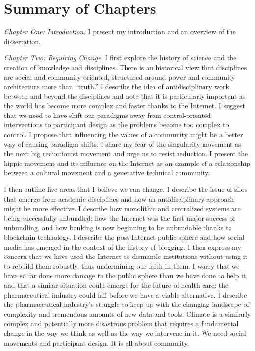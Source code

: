 \section{Summary of Chapters}

\emph{Chapter One: Introduction.} I present my introduction and an overview of the dissertation.

\emph{Chapter Two: Requiring Change.} I first explore the history of science and the creation of knowledge and disciplines. There is an historical view that disciplines are social and community-oriented, structured around power and community architecture more than ``truth.'' I describe the idea of antidisciplinary work between and beyond the disciplines and note that it is particularly important as the world has become more complex and faster thanks to the Internet. I suggest that we need to have shift our paradigms away from control-oriented interventions to participant design as the problems become too complex to control. I propose that influencing the values of a community might be a better way of causing paradigm shifts. I share my fear of the singularity movement as the next big reductionist movement and urge us to resist reduction. I present the hippie movement and its influence on the Internet as an example of a relationship between a cultural movement and a generative technical community.

I then outline five areas that I believe we can change. I describe the issue of silos that emerge from academic disciplines and how an antidisciplinary approach might be more effective. I describe how monolithic and centralized systems are being successfully unbundled; how the Internet was the first major success of unbundling, and how banking is now beginning to be unbundable thanks to blockchain technology. I describe the post-Internet public sphere and how social media has emerged in the context of the history of blogging. I then express my concern that we have used the Internet to dismantle institutions without using it to rebuild them robustly, thus undermining our faith in them. I worry that we have so far done more damage to the public sphere than we have done to help it, and that a similar situation could emerge for the future of health care: the pharmaceutical industry could fail before we have a viable alternative. I describe the pharmaceutical industry's struggle to keep up with the changing landscape of complexity and tremendous amounts of new data and tools. Climate is a similarly complex and potentially more disastrous problem that requires a fundamental change in the way we think as well as the way we intervene in it. We need social movements and participant design. It is all about community.

